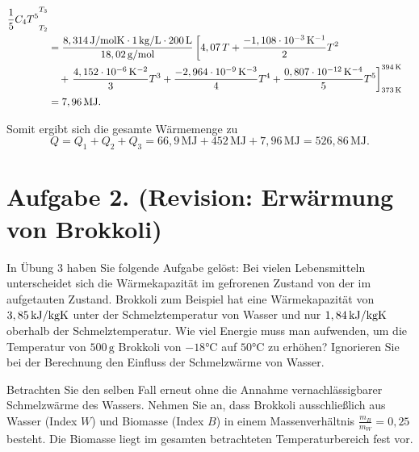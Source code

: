 \documentclass[german,12pt]{homework}
\begin{document}
\begin{enumerate}
\begin{align*}
{            \frac{1}{5}C_4T^5}_{T_2}^{T_3}\\
            &= \frac{8,314\,\si{\joule\per{\mole\kelvin}} \cdot
            1\,\si{\kg\per{\liter}} \cdot
            200\,\si{\liter}}{18,02\,\si{\g\per{\mole}}}\left[4,07\,T + \frac{-
            1,108 \cdot 10^{-3}\,\si{\per\kelvin}}{2}T^2\right.\\
            &\ \ \ + \left.\frac{4,152 \cdot 10^{-
            6}\,\si{\per\kelvin\squared}}{3}T^3 + \frac{-2,964 \cdot 10^{-
            9}\,\si{\per\kelvin\cubed}}{4}T^4 + \frac{0,807 \cdot 10^{-
            12}\,\si{\per\kelvin\tothe{4}}}{5}T^5\right]_{373\,\si{\kelvin}}^{39
            4\,\si{\kelvin}}\\
            & = 7,96\,\si{\mega\joule}.
        \end{align*}
    \end{enumerate}
    Somit ergibt sich die gesamte Wärmemenge zu
    \[Q = Q_1 + Q_2 + Q_3 = 66,9\,\si{\mega\joule} + 452\,\si{\mega\joule} +
    7,96\,\si{\mega\joule} = 526,86\,\si{\mega\joule}.\]

    \section*{Aufgabe 2. (Revision: Erwärmung von Brokkoli)}

    \begin{problem}
        In Übung 3 haben Sie folgende Aufgabe gelöst: Bei vielen Lebensmitteln
        unterscheidet sich die Wärmekapazität im gefrorenen Zustand von der im
        aufgetauten Zustand. Brokkoli zum Beispiel hat eine Wärmekapazität von
        \(3,85\,\si{\kilo\joule\per{\kg\kelvin}}\) unter der Schmelztemperatur
        von Wasser und nur \(1,84\,\si{\kilo\joule\per{\kg\kelvin}}\) oberhalb
        der Schmelztemperatur. Wie viel Energie muss man aufwenden, um die
        Temperatur von \(500\,\si{\g}\) Brokkoli von \(-18\si{\degreeCelsius}\)
        auf \(50\si{\degreeCelsius}\) zu erhöhen? Ignorieren Sie bei der
        Berechnung den Einfluss der Schmelzwärme von Wasser.

        Betrachten Sie den selben Fall erneut ohne die Annahme
        vernachlässigbarer Schmelzwärme des Wassers. Nehmen Sie an, dass
        Brokkoli ausschließlich aus Wasser (Index \(W\)) und Biomasse (Index
        \(B\)) in einem Massenverhältnis \(\frac{m_B}{m_W} = 0,25\) besteht.
        Die Biomasse liegt im gesamten betrachteten Temperaturbereich fest vor.
    \end{problem}
\end{document}
